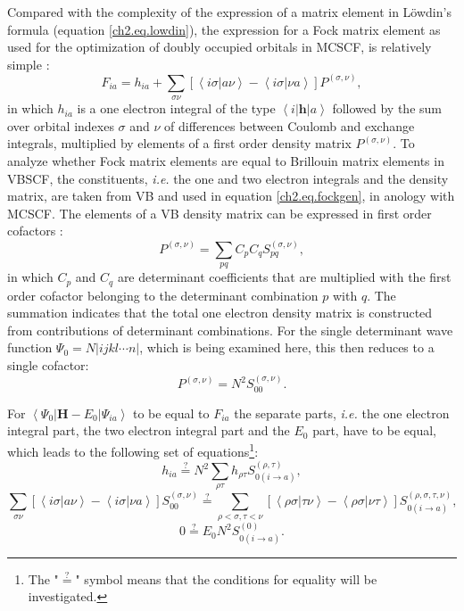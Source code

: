 Compared with the complexity of the expression of a matrix element in L\"{o}wdin's formula (equation \ref{ch2.eq.lowdin}), the expression for a Fock matrix element as used for the optimization of doubly occupied orbitals in MCSCF, is relatively simple \cite{roos1}:
\begin{equation}
F_{ia} = h_{ia} + \sum_{\sigma \nu} [ \left <i \sigma | a \nu \right > - \left < i \sigma | \nu a \right> ]P^{(\sigma,\nu)},
\label{ch2.eq.fockgen}
\end{equation}
in which $h_{ia}$ is a one electron integral of the type $\left < i | \mathbf{h} | a \right> $ followed by the sum over orbital indexes $\sigma$ and $\nu$ of differences between Coulomb and exchange integrals, multiplied by elements of a first order density matrix $P^{(\sigma,\nu)}$. To analyze whether Fock matrix elements are equal to Brillouin matrix elements in VBSCF, the constituents, \textit{i.e.} the one and two electron integrals and the density matrix, are taken from VB and used in equation \ref{ch2.eq.fockgen}, in anology with MCSCF. The elements of a VB density matrix can be expressed in first order cofactors \cite{joopboek}:
\begin{equation}
P^{(\sigma,\nu)} = \sum_{pq}  C_p C_q S_{pq}^{(\sigma,\nu)},
\label{ch2.eq.densmat1}
\end{equation}
in which $C_p$ and $C_q$ are determinant coefficients that are multiplied with the first order cofactor belonging to the determinant combination $p$ with $q$.  The summation indicates that the total one electron density matrix is constructed from contributions of determinant combinations. For the single determinant wave function $\Psi_0 = N |ijkl \cdots n|$, which is being examined here, this then reduces to a single cofactor:
\begin{equation}
P^{(\sigma,\nu)} = N^2 S_{00}^{(\sigma,\nu)}.
\label{ch2.eq.densmat2}
\end{equation}
  
For $\left < \Psi_0 | \mathbf{H} - E_0 | \Psi_{ia} \right >$ to be equal to $F_{ia}$ the separate parts, \textit{i.e.} the one electron integral part, the two electron integral part and the $E_0$ part, have to be equal, which leads to the following set of equations\footnote{The "$\stackrel{?}{=}$" symbol means that the conditions for equality will be investigated.}:
\begin{equation}
h_{ia} \stackrel {?}{=} N^2 \sum_{\rho\tau} h_{\rho\tau} S_{0(i\rightarrow a)}^{(\rho,\tau)},
\label{ch2.eq.oneelpart}
\end{equation}
\begin{equation}
\sum_{\sigma \nu} [ \left <i \sigma | a \nu \right > - \left < i \sigma | \nu a \right> ]S_{00}^{(\sigma,\nu)} \stackrel {?}{=}  \sum_{\rho<\sigma,\tau<\nu} [\left <\rho\sigma|\tau\nu \right > - \left < \rho\sigma | \nu\tau \right> ]  S_{0(i\rightarrow a)}^{(\rho,\sigma,\tau,\nu)},
\label{ch2.eq.twoelpart}
\end{equation}
\begin{equation}
0 \stackrel {?}{=} E_0 N^2 S_{0(i\rightarrow a)}^{(0)}.
\label{ch2.eq.e0part}
\end{equation}

